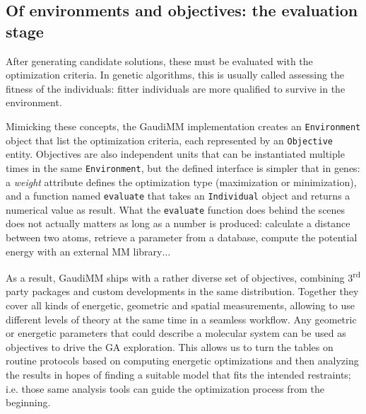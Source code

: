 


\subsection{Of environments and objectives: the evaluation stage}
After generating candidate solutions, these must be evaluated with the optimization criteria. In genetic algorithms, this is usually called assessing the fitness of the individuals: fitter individuals are more qualified to survive in the environment.

Mimicking these concepts, the GaudiMM implementation creates an \texttt{Environment} object that list the optimization criteria, each represented by an \texttt{Objective} entity. Objectives are also independent units that can be instantiated multiple times in the same \texttt{Environment}, but the defined interface is simpler that in genes: a \textit{weight} attribute defines the optimization type (maximization or minimization), and a function named \texttt{evaluate} that takes an \texttt{Individual} object and returns a numerical value as result. What the \texttt{evaluate} function does behind the scenes does not actually matters as long as a number is produced: calculate a distance between two atoms, retrieve a parameter from a database, compute the potential energy with an external MM library$ \ldots $

As a result, GaudiMM ships with a rather diverse set of objectives, combining 3\textsuperscript{rd} party packages and custom developments in the same distribution. Together they cover all kinds of energetic, geometric and spatial measurements, allowing to use different levels of theory at the same time in a seamless workflow. Any geometric or energetic parameters that could describe a molecular system can be used as objectives to drive the GA exploration. This allows us to turn the tables on routine protocols based on computing energetic optimizations and then analyzing the results in hopes of finding a suitable model that fits the intended restraints; i.e. those same analysis tools can guide the optimization process from the beginning.


